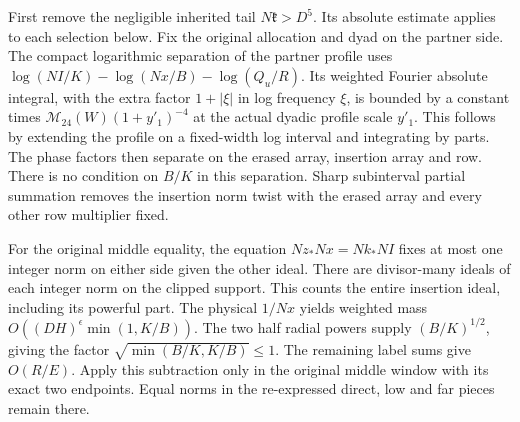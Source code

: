 First remove the negligible inherited tail \(N\mathfrak k>D^5\).
Its absolute estimate applies to each selection below. Fix the
original allocation and dyad on the partner side. The compact
logarithmic separation of the partner profile uses
\(\log(NI/K)-\log(Nx/B)-\log(Q_u/R)\).
Its weighted Fourier absolute integral, with the extra factor
\(1+|\xi|\) in log frequency \(\xi\), is bounded by a constant
times \(\mathcal M_{24}(W)(1+y'_1)^{-4}\) at the actual
dyadic profile scale \(y'_1\). This follows by extending the
profile on a fixed-width log interval and integrating by parts.
The phase factors then separate on the erased array, insertion
array and row. There is no condition on \(B/K\) in this separation.
Sharp subinterval partial summation removes the insertion norm
twist with the erased array and every other row multiplier fixed.

For the original middle equality, the equation
\(Nz_*Nx=Nk_*NI\) fixes at most one integer norm on either side
given the other ideal. There are divisor-many ideals of each
integer norm on the clipped support. This counts the entire
insertion ideal, including its powerful part. The physical
\(1/Nx\) yields weighted mass
\(O((DH)^\epsilon\min(1,K/B))\). The two half radial powers
supply \((B/K)^{1/2}\), giving the factor
\(\sqrt{\min(B/K,K/B)}\le1\). The remaining label sums give
\(O(R/E)\). Apply this subtraction only in the original middle
window with its exact two endpoints. Equal norms in the
re-expressed direct, low and far pieces remain there.

